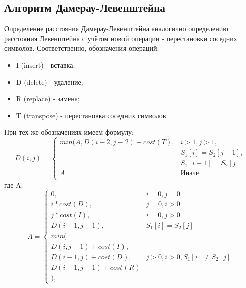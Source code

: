 \subsection{Алгоритм Дамерау-Левенштейна}
Определение расстояния Дамерау-Левенштейна аналогично определению расстояния Левенштейна с учётом новой операции - перестановки соседних символов. Соответственно, обозначения операций:
\begin{itemize}
    \item I (insert) - вставка;
    \item D (delete) - удаление;
    \item R (replace) - замена;
    \item T (transpose) - перестановка соседних символов.
\end{itemize}

При тех же обозначениях имеем формулу:
\begin{equation}
D(i,j) = \left\{ \begin{array}{ll}
 min(A, D(i - 2, j - 2) + cost(T), & \textrm{$i > 1, j > 1,$}\\
 & \textrm{$S_1[i] = S_2[j - 1],$}\\
 & \textrm{$S_1[i - 1] = S_2[j]$}\\
 A & \textrm{Иначе}\\
  \end{array} \right.
\end{equation}
где A:
\begin{equation}
A = \left\{ \begin{array}{ll}
 0, & \textrm{$i = 0, j = 0$}\\
 i * cost(D), & \textrm{$j = 0, i > 0$}\\
 j * cost(I), & \textrm{$i = 0, j > 0$}\\
 D(i - 1, j - 1), & \textrm{$S_{1}[i] = S_{2}[j]$}\\
min(\\
D(i,j-1) + cost(I),\\
D(i-1, j) + cost(D), &\textrm{$j > 0, i > 0, S_1[i] \neq S_2[j]$}\\
D(i-1, j-1) + cost(R)\\
),
  \end{array} \right.
\end{equation}


